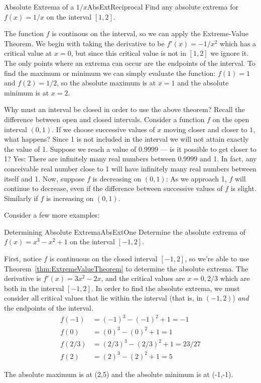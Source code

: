 \begin{example}{Absolute Extrema of a $1/x$}{AbsExtReciprocal}
	Find any absolute extrema for $f(x)=1/x$ on the interval $[1,2]$.
\end{example}
\begin{solution}
	The function $f$ is continous on the interval, so we can apply the
	Extreme-Value Theorem. We begin with taking the derivative to be
	$f'(x)=-1/x^2$ which has a critical value at $x=0$, but since this
	critical value is not in $[1,2]$ we ignore it. The only points where
	an extrema can occur are the endpoints of the interval. To find the
	maximum or minimum we can simply evaluate the function: $f(1)=1$ and
	$f(2)=1/2$, so the absolute maximum is at $x=1$ and the absolute minimum is at $x=2$.
\end{solution}

Why must an interval be closed in order to use the above theorem? Recall
the difference between open and
closed intervals. Consider a function $f$ on the open interval $(0,1)$.
If we choose successive values of $x$ moving closer and closer to $1$,
what happens? Since 1 is not included in the interval we will not attain
exactly the value of 1. Suppose we reach a value of 0.9999 --- is it
possible to get closer to 1? Yes: There are infinitely many real numbers
between 0.9999 and 1. In fact, any conceivable real number close to 1
will have infinitely many real numbers between itself and 1. Now, suppose
$f$ is decreasing on $(0,1)$: As we approach 1, $f$ will continue to
decrease, even if the difference between successive values of $f$ is
slight. Similarly if $f$ is increasing on $(0,1)$.

Consider a few more examples:

\begin{example}{Determining Absolute Extrema}{AbsExtOne}
	Determine the absolute extrema of $f(x)=x^3-x^2+1$ on the interval $[-1,2]$.
\end{example}
\begin{solution}
	First, notice $f$ is continuous on the closed interval $[-1,2]$, so
	we're able to use Theorem~\ref{thm:ExtremeValueTheorem} to determine
	the absolute extrema. The derivative is $f'(x)=3x^2-2x$, and the critical
	values are $x=0,2/3$ which are both in the interval $[-1,2]$. In order
	to find the absolute extrema, we must consider all critical values that
	lie within the interval (that is, in $(-1,2)$) \emph{and} the endpoints of the interval.
	\begin{align*}
		f(-1)&=(-1)^3-(-1)^2+1=-1	\\
		f(0)&=(0)^3-(0)^2+1=1	\\
		f(2/3)&=(2/3)^3-(2/3)^2+1=23/27	\\
		f(2)&=(2)^3-(2)^2+1=5
	\end{align*}
	
	The absolute maximum is at (2,5) and the absolute minimum is at (-1,-1).
\end{solution}

